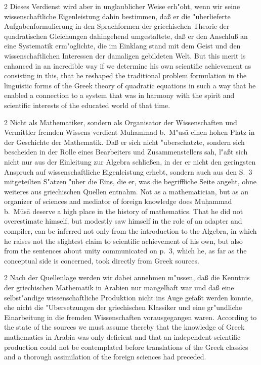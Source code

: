 \documentclass[10pt,a4paper]{article}
\renewcommand{\switchcolumn}{\syncronize\nointerlineskip\columnbreak}
\begin{document}
\begin{paracol}{2}
Dieses Verdienst wird aber in unglaublicher Weise erh"oht, wenn wir seine wissenschaftliche Eigenleistung dahin bestimmen, da\ss{} er die "uberlieferte Aufgabenformulierung in den Sprachformen der griechischen Theorie der quadratischen Gleichungen dahingehend umgestaltete, da\ss{} er den Anschlu\ss{} an eine Systematik erm"oglichte, die im Einklang stand mit dem Geist und den wissenschaftlichen Interessen der damaligen gebildeten Welt.
\switchcolumn
But this merit is enhanced in an incredible way if we determine his own scientific achievement as consisting in this, that he reshaped the traditional problem formulation in the linguistic forms of the Greek theory of quadratic equations in such a way that he enabled a connection to a system that was in harmony with the spirit and scientific interests of the educated world of that time.
\end{paracol}

\begin{paracol}{2}
Nicht als Mathematiker, sondern als Organisator der Wissenschaften und Vermittler fremden Wissens verdient Muhammad b.\ M"us\=a einen hohen Platz in der Geschichte der Mathematik. Da\ss{} er sich nicht "uberschatzte, sondern sich bescheiden in der Rolle eines Bearbeiters und Zusammenstellers sah, l"a\ss{}t sich nicht nur aus der Einleitung zur Algebra schlie\ss{}en, in der er nicht den geringsten Anspruch auf wissenschaftliche Eigenleistung erhebt, sondern auch aus den S.\ 3 mitgeteilten S"atzen "uber die Eins, die er, was die begriffliche Seite angeht, ohne weiteres aus griechischen Quellen entnahm.
\switchcolumn
Not as a mathematician, but as an organizer of sciences and mediator of foreign knowledge does Mu\d{h}ammad b.\ M\=us\=a deserve a high place in the history of mathematics. That he did not overestimate himself, but modestly saw himself in the role of an adapter and compiler, can be inferred not only from the introduction to the Algebra, in which he raises not the slightest claim to scientific achievement of his own, but also from the sentences about unity communicated on p.\ 3, which he, as far as the conceptual side is concerned, took directly from Greek sources.
\end{paracol}

\begin{paracol}{2}
Nach der Quellenlage werden wir dabei annehmen m"ussen, da\ss{} die Kenntnis der griechischen Mathematik in Arabien nur mangelhaft war und da\ss{} eine selbst"andige wissenschaftliche Produktion nicht ins Auge gefa\ss{}t werden konnte, ehe nicht die "Ubersetzungen der griechischen Klassiker und eine gr"undliche Einarbeitung in die fremden Wissenschaften vorausgegangen waren.
\switchcolumn
According to the state of the sources we must assume thereby that the knowledge of Greek mathematics in Arabia was only deficient and that an independent scientific production could not be contemplated before translations of the Greek classics and a thorough assimilation of the foreign sciences had preceded.
\end{paracol}
\end{document}
